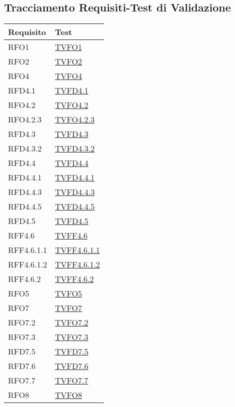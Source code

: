 \subsection{Tracciamento Requisiti-Test di Validazione}
\normalsize
\begin{longtable}{|>{\centering}m{5cm}|m{5cm}<{\centering}|}
\hline 
\textbf{Requisito} & \textbf{Test}\\
\hline
\endhead
RFO1 & \hyperlink{TVFO1}{TVFO1}\\ \hline
RFO2 & \hyperlink{TVFO2}{TVFO2}\\ \hline
RFO4 & \hyperlink{TVFO4}{TVFO4}\\ \hline
RFD4.1 & \hyperlink{TVFD4.1}{TVFD4.1}\\ \hline
RFO4.2 & \hyperlink{TVFO4.2}{TVFO4.2}\\ \hline
RFO4.2.3 & \hyperlink{TVFO4.2.3}{TVFO4.2.3}\\ \hline
RFD4.3 & \hyperlink{TVFD4.3}{TVFD4.3}\\ \hline
RFD4.3.2 & \hyperlink{TVFD4.3.2}{TVFD4.3.2}\\ \hline
RFD4.4 & \hyperlink{TVFD4.4}{TVFD4.4}\\ \hline
RFD4.4.1 & \hyperlink{TVFD4.4.1}{TVFD4.4.1}\\ \hline
RFD4.4.3 & \hyperlink{TVFD4.4.3}{TVFD4.4.3}\\ \hline
RFD4.4.5 & \hyperlink{TVFD4.4.5}{TVFD4.4.5}\\ \hline
RFD4.5 & \hyperlink{TVFD4.5}{TVFD4.5}\\ \hline
RFF4.6 & \hyperlink{TVFF4.6}{TVFF4.6}\\ \hline
RFF4.6.1.1 & \hyperlink{TVFF4.6.1.1}{TVFF4.6.1.1}\\ \hline
RFF4.6.1.2 & \hyperlink{TVFF4.6.1.2}{TVFF4.6.1.2}\\ \hline
RFF4.6.2 & \hyperlink{TVFF4.6.2}{TVFF4.6.2}\\ \hline
RFO5 & \hyperlink{TVFO5}{TVFO5}\\ \hline
RFO7 & \hyperlink{TVFO7}{TVFO7}\\ \hline
RFO7.2 & \hyperlink{TVFO7.2}{TVFO7.2}\\ \hline
RFO7.3 & \hyperlink{TVFO7.3}{TVFO7.3}\\ \hline
RFD7.5 & \hyperlink{TVFD7.5}{TVFD7.5}\\ \hline
RFD7.6 & \hyperlink{TVFD7.6}{TVFD7.6}\\ \hline
RFO7.7 & \hyperlink{TVFO7.7}{TVFO7.7}\\ \hline
RFO8 & \hyperlink{TVFO8}{TVFO8}\\ \hline

\end{longtable}
